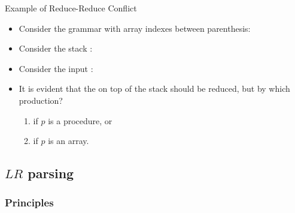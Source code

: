\begin{bibunit}[apalike]
\begin{frame}{Example of Reduce-Reduce Conflict}	
	\begin{itemize}
	\item Consider the grammar with array indexes between parenthesis: \\
		\begin{footnotesize}\begin{bnf}
		\end{bnf}\end{footnotesize}
	\item Consider the stack : 
	\item Consider the input : 
	\vfill
	\item It is evident that the  on top of the stack should be reduced, but by which production?
		\begin{enumerate}
		\item {} if $p$ is a procedure, or
		\item {} if $p$ is an array.
		\end{enumerate}
	\end{itemize}
\end{frame}

\subsection{$LR$ parsing}

\tableofcontentslide[sectionstyle={show/shaded},subsectionstyle={show/shaded/hide},subsubsectionstyle={show/show/hide/hide}]

\subsubsection{Principles}


\end{bibunit}
